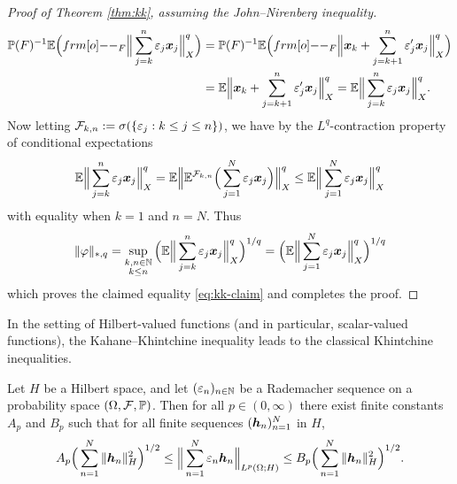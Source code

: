 \begin{proof}[Proof of Theorem \ref{thm:kk}, assuming the John--Nirenberg inequality]
\begin{equation*}
\begin{aligned}
      \P(F)^{-1} \E \Big( \1_{F} \Big\| \sum_{j=k}^{n} \varepsilon_j \mb{x}_j\Big\|_{X}^q \Big)
      &=  \P(F)^{-1} \E \Big( \1_{F} \Big\|\mb{x}_k + \sum_{j=k+1}^{n} \varepsilon_{j}^{\prime} \mb{x}_j \Big\|_{X}^{q} \Big) \\
      &=  \E \Big\|\mb{x}_k + \sum_{j=k+1}^{n} \varepsilon_{j}^{\prime} \mb{x}_j \Big\|_{X}^{q} 
      =  \E  \Big\|\sum_{j=k}^{n} \varepsilon_{j} \mb{x}_j \Big\|_{X}^{q}. \\
    \end{aligned}
  \end{equation*}
  Now letting $\mathcal{F}_{k,n} := \sigma(\{\varepsilon_j : k \leq j \leq n\})$, we have by the $L^q$-contraction property of conditional expectations
  \begin{equation*}
    \mathbb{E} \Big\|\sum_{j=k}^{n} \varepsilon_{j} \bm{x}_j \Big\|_{X}^{q}
    = \mathbb{E} \Big\|\mathbb{E}^{\mathcal{F}_{k,n}} \Big(\sum_{j=1}^{N} \varepsilon_{j} \bm{x}_j \Big)\Big\|_{X}^{q}
    \leq \mathbb{E} \Big\|\sum_{j=1}^{N} \varepsilon_{j} \bm{x}_j \Big\|_{X}^{q}
  \end{equation*}
  with equality when $k=1$ and $n=N$.
  Thus
  \begin{equation*}
    \|\varphi\|_{*,q} =  \sup_{\substack{k,n \in \mathbb{N} \\ k \leq n}}  \Big(\mathbb{E}  \Big\|\sum_{j=k}^{n} \varepsilon_{j} \bm{x}_j \Big\|_{X}^{q}\Big)^{1/q} = \Big(\mathbb{E}  \Big\|\sum_{j=1}^{N} \varepsilon_{j} \bm{x}_j \Big\|_{X}^{q}\Big)^{1/q}
  \end{equation*}
  which proves the claimed equality \eqref{eq:kk-claim} and completes the proof. 
\end{proof}

In the setting of Hilbert-valued functions (and in particular, scalar-valued functions), the Kahane--Khintchine inequality leads to the classical Khintchine inequalities.

\begin{cor}
  Let $H$ be a Hilbert space, and let $(\varepsilon_{n})_{n \in \mathbb{N}}$ be a Rademacher sequence on a probability space $(\Omega, \mathcal{F}, \mathbb{P})$.
  Then for all $p \in (0,\infty)$ there exist finite constants $A_p$ and $B_p$ such that for all finite sequences $(\bm{h}_n)_{n=1}^N$ in $H$,
  \begin{equation*}
    A_p \Big( \sum_{n=1}^N \|\bm{h}_n\|_H^2 \Big)^{1/2} \leq \Big\| \sum_{n=1}^N \varepsilon_n \bm{h}_n \Big\|_{L^p(\Omega;H)} \leq B_p \Big( \sum_{n=1}^N \|\bm{h}_n\|_H^2 \Big)^{1/2}.
  \end{equation*}
\end{cor}

